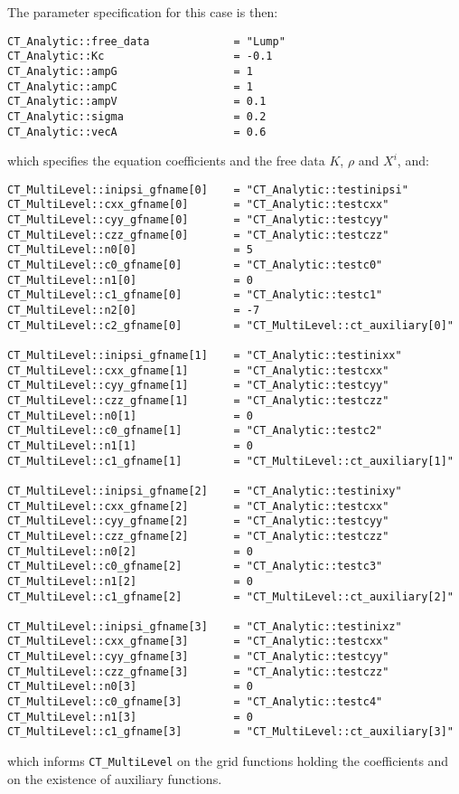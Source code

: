 The parameter specification for this case is then:
\begin{verbatim}
CT_Analytic::free_data             = "Lump"
CT_Analytic::Kc                    = -0.1
CT_Analytic::ampG                  = 1
CT_Analytic::ampC                  = 1
CT_Analytic::ampV                  = 0.1
CT_Analytic::sigma                 = 0.2
CT_Analytic::vecA                  = 0.6
\end{verbatim}
which specifies the equation coefficients and the free data 
$K$, $\rho$ and $X^i$, and:
\begin{verbatim}
CT_MultiLevel::inipsi_gfname[0]    = "CT_Analytic::testinipsi"
CT_MultiLevel::cxx_gfname[0]       = "CT_Analytic::testcxx"
CT_MultiLevel::cyy_gfname[0]       = "CT_Analytic::testcyy"
CT_MultiLevel::czz_gfname[0]       = "CT_Analytic::testczz"
CT_MultiLevel::n0[0]               = 5
CT_MultiLevel::c0_gfname[0]        = "CT_Analytic::testc0"
CT_MultiLevel::n1[0]               = 0
CT_MultiLevel::c1_gfname[0]        = "CT_Analytic::testc1"
CT_MultiLevel::n2[0]               = -7
CT_MultiLevel::c2_gfname[0]        = "CT_MultiLevel::ct_auxiliary[0]"

CT_MultiLevel::inipsi_gfname[1]    = "CT_Analytic::testinixx"
CT_MultiLevel::cxx_gfname[1]       = "CT_Analytic::testcxx"
CT_MultiLevel::cyy_gfname[1]       = "CT_Analytic::testcyy"
CT_MultiLevel::czz_gfname[1]       = "CT_Analytic::testczz"
CT_MultiLevel::n0[1]               = 0
CT_MultiLevel::c0_gfname[1]        = "CT_Analytic::testc2"
CT_MultiLevel::n1[1]               = 0
CT_MultiLevel::c1_gfname[1]        = "CT_MultiLevel::ct_auxiliary[1]"

CT_MultiLevel::inipsi_gfname[2]    = "CT_Analytic::testinixy"
CT_MultiLevel::cxx_gfname[2]       = "CT_Analytic::testcxx"
CT_MultiLevel::cyy_gfname[2]       = "CT_Analytic::testcyy"
CT_MultiLevel::czz_gfname[2]       = "CT_Analytic::testczz"
CT_MultiLevel::n0[2]               = 0
CT_MultiLevel::c0_gfname[2]        = "CT_Analytic::testc3"
CT_MultiLevel::n1[2]               = 0
CT_MultiLevel::c1_gfname[2]        = "CT_MultiLevel::ct_auxiliary[2]"

CT_MultiLevel::inipsi_gfname[3]    = "CT_Analytic::testinixz"
CT_MultiLevel::cxx_gfname[3]       = "CT_Analytic::testcxx"
CT_MultiLevel::cyy_gfname[3]       = "CT_Analytic::testcyy"
CT_MultiLevel::czz_gfname[3]       = "CT_Analytic::testczz"
CT_MultiLevel::n0[3]               = 0
CT_MultiLevel::c0_gfname[3]        = "CT_Analytic::testc4"
CT_MultiLevel::n1[3]               = 0
CT_MultiLevel::c1_gfname[3]        = "CT_MultiLevel::ct_auxiliary[3]"
\end{verbatim}
which informs \texttt{CT\_MultiLevel} on the grid functions holding
the coefficients and on the existence of auxiliary functions.

